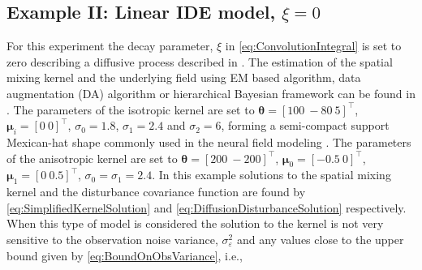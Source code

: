 \documentclass[10pt,twocolumn,twoside]{IEEEtran}
\begin{document}
\subsection{Example II: Linear IDE model, $\xi=0$}
For this experiment the decay parameter, $\xi$ in \eqref{eq:ConvolutionIntegral} is set to zero describing a diffusive process described in \cite{Kot1992,Kot1996,Wikle1999,Xu2005}. The estimation of the spatial mixing kernel and the underlying field using  EM based algorithm, data augmentation (DA) algorithm or hierarchical Bayesian framework can be found in \cite{Dewar2009,Scerri2009,Wikle1999,Xu2005,Wikle2011}. The parameters of the isotropic kernel are set to $\boldsymbol\theta=[100~-80~5]^{\top}$,  $\boldsymbol\mu_i=[0~0]^{\top}$, $\sigma_0=1.8$, $\sigma_1=2.4$ and $\sigma_2=6$, forming a semi-compact support Mexican-hat shape commonly used in the neural field modeling \cite{Amari1977,Atay2005,Breakspear2010}. The parameters of the anisotropic kernel are set to $\boldsymbol\theta=[200~-200]^{\top}$, $\boldsymbol\mu_0=[-0.5~0]^{\top}$, $\boldsymbol\mu_1=[0~0.5]^{\top}$, $\sigma_0=\sigma_1=2.4$.  
In this example solutions to the spatial mixing kernel and the disturbance covariance function are found by \eqref{eq:SimplifiedKernelSolution}   and \eqref{eq:DiffusionDisturbanceSolution} respectively. When this type of model is considered the solution to the kernel is not very sensitive to the observation noise variance, $\sigma_{\varepsilon}^2$ and any values close to the upper bound given by \eqref{eq:BoundOnObsVariance}, i.e., 
\end{document}
